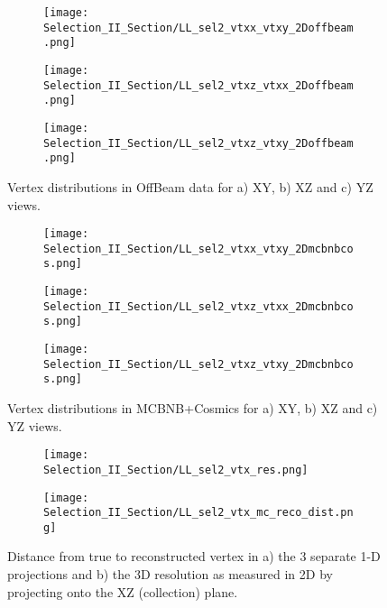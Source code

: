 \documentclass{article}
\begin{document}
\begin{figure}[t!]
\centering
  \begin{subfigure}[t]{0.26\textwidth}
    \centering
\texttt{[image: Selection\_II\_Section/LL\_sel2\_vtxx\_vtxy\_2Doffbeam.png]}
    \caption{ }
  \end{subfigure} 
  \hspace{10 mm}
  \begin{subfigure}[t]{0.26\textwidth}
    \centering
\texttt{[image: Selection\_II\_Section/LL\_sel2\_vtxz\_vtxx\_2Doffbeam.png]}
    \caption{ }
  \end{subfigure} 
  \hspace{10 mm}
  \begin{subfigure}[t]{0.26\textwidth}
    \centering
\texttt{[image: Selection\_II\_Section/LL\_sel2\_vtxz\_vtxy\_2Doffbeam.png]}
    \caption{ }
  \end{subfigure} 

\caption{ Vertex distributions in OffBeam data for a) XY, b) XZ and c) YZ views. }
\label{fig:ll_sel2_vertices_offbeam}
\end{figure}

\begin{figure}[h!]
\centering
  \begin{subfigure}[t]{0.26\textwidth}
    \centering
\texttt{[image: Selection\_II\_Section/LL\_sel2\_vtxx\_vtxy\_2Dmcbnbcos.png]}
    \caption{ }
  \end{subfigure} 
  \hspace{10 mm}
  \begin{subfigure}[t]{0.26\textwidth}
    \centering
\texttt{[image: Selection\_II\_Section/LL\_sel2\_vtxz\_vtxx\_2Dmcbnbcos.png]}
    \caption{ }
  \end{subfigure} 
  \hspace{10 mm}
  \begin{subfigure}[t]{0.26\textwidth}
    \centering
\texttt{[image: Selection\_II\_Section/LL\_sel2\_vtxz\_vtxy\_2Dmcbnbcos.png]}
    \caption{ }
  \end{subfigure} 
\caption{ Vertex distributions in MCBNB+Cosmics for a) XY, b) XZ and c) YZ views. }
\label{fig:ll_sel2_vertices_mc}
\end{figure}


\begin{figure}[t!]
\centering
 \begin{subfigure}[t]{0.35\textwidth}
    \centering
\texttt{[image: Selection\_II\_Section/LL\_sel2\_vtx\_res.png]}
    \caption{ }
  \end{subfigure} 
  \hspace{10 mm}
  \begin{subfigure}[t]{0.35\textwidth}
    \centering
\texttt{[image: Selection\_II\_Section/LL\_sel2\_vtx\_mc\_reco\_dist.png]}
    \caption{ }
  \end{subfigure} 

\caption{Distance from true to reconstructed vertex in a) the 3 separate 1-D projections and b) the 3D resolution as measured in 2D by projecting onto the XZ (collection) plane. }
\label{fig:physics_sel2_vtxres}
\end{figure}
\end{document}
